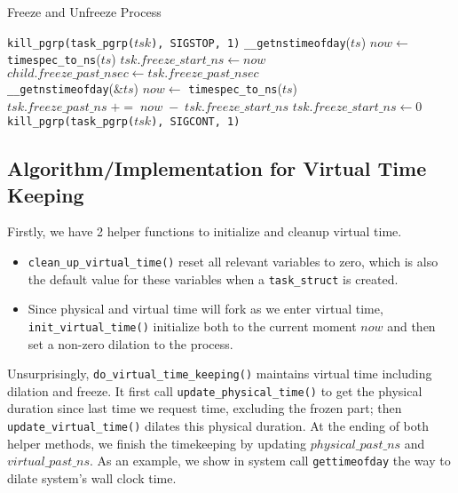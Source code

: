 \documentclass{acm_proc_article-sp}
\begin{document}
\label{Sub-Sec-Alg-Impl-Freeze}
\begin{algorithm*}[t]
\caption{Freeze and Unfreeze Process}
\label{Alg-Freeze}
\begin{algorithmic}[1]
\State \texttt{kill\_pgrp(task\_pgrp($tsk$), SIGSTOP, 1)}
\State \texttt{\_\_getnstimeofday}($ts$)
\State $now \gets$ \texttt{timespec\_to\_ns}($ts$)
\State $tsk.freeze\_start\_ns \gets now$
\EndFunction
\\
	\State $child.freeze\_past\_nsec \gets tsk.freeze\_past\_nsec$
	\State {}
\EndFor
\EndFunction
\\
\State \texttt{\_\_getnstimeofday}(\&$ts$)
\State $now \gets$ \texttt{timespec\_to\_ns}($ts$)
\State $tsk.freeze\_past\_ns \; += \; now \; - \; tsk.freeze\_start\_ns$
\State $tsk.freeze\_start\_ns \gets 0$
\State {}
\State \texttt{kill\_pgrp(task\_pgrp($tsk$), SIGCONT, 1)}
\EndFunction
\end{algorithmic}
\end{algorithm*}

\subsection{Algorithm/Implementation for Virtual Time Keeping}
Firstly, we have 2 helper functions to initialize and cleanup virtual time. 
\begin{itemize}
\item \texttt{clean\_up\_virtual\_time()} reset all relevant variables to zero, which is also the default value for these variables when a \texttt{task\_struct} is created.
\item Since physical and virtual time will fork as we enter virtual time, \texttt{init\_virtual\_time()} initialize both to the current moment $now$ and then set a non-zero dilation to the process. 
\end{itemize}

Unsurprisingly, \texttt{do\_virtual\_time\_keeping()} maintains virtual time including dilation and freeze. 
It first call \texttt{update\_physical\_time()} to get the physical duration since last time we request time, excluding the frozen part; then 
\texttt{update\_virtual\_time()} dilates this physical duration.
At the ending of both helper methods, we finish the timekeeping by updating $physical\_past\_ns$ and $virtual\_past\_ns$.
As an example, we show in system call \texttt{gettimeofday} the way to dilate system's wall clock time. 
\end{document}
